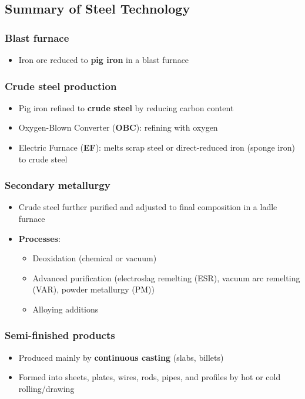 \documentclass{article}
\begin{document}
\newpage
\subsection{Summary of Steel Technology}
\subsubsection{Blast furnace}
\begin{itemize}
  \item Iron ore reduced to \textbf{pig iron} in a blast furnace
\end{itemize}

\subsubsection{Crude steel production}
\begin{itemize}
  \item Pig iron refined to \textbf{crude steel} by reducing carbon content
  \item Oxygen-Blown Converter (\textbf{OBC}): refining with oxygen
  \item Electric Furnace (\textbf{EF}): melts scrap steel or direct-reduced iron (sponge iron) to crude steel
\end{itemize}

\subsubsection{Secondary metallurgy}
\begin{itemize}
  \item Crude steel further purified and adjusted to final composition in a ladle furnace
  \item \textbf{Processes}:
  \begin{itemize}
    \item Deoxidation (chemical or vacuum)
    \item Advanced purification (electroslag remelting (ESR), vacuum arc remelting (VAR), powder metallurgy (PM))
    \item Alloying additions
  \end{itemize}
\end{itemize}

\subsubsection{Semi-finished products}
\begin{itemize}
  \item Produced mainly by \textbf{continuous casting} (slabs, billets)
  \item Formed into sheets, plates, wires, rods, pipes, and profiles by hot or cold rolling/drawing
\end{itemize}
\end{document}
